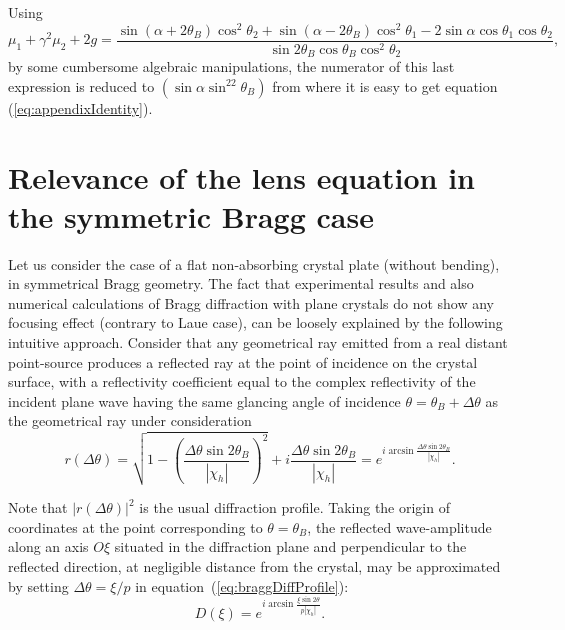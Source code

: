 \documentclass[preprint]{iucr}              %
\newcommand{\inred}[1]{{\color{red}#1}}
\begin{document}
Using
\inred{
\begin{equation}
    \mu_1 + \gamma^2 \mu_2 + 2 g = \frac{
    \sin(\alpha+2 \theta_B)\cos^2\theta_2 + \sin(\alpha-2\theta_B) \cos^2\theta_1 - 2 \sin\alpha \cos\theta_1 \cos\theta_2
    }{
    \sin2\theta_B \cos\theta_B \cos^2\theta_2
    },
\end{equation}
by some cumbersome algebraic manipulations, the numerator of this last expression is reduced to $(\sin\alpha \sin^22\theta_B)$ from where it is easy to get equation (\ref{eq:appendixIdentity}).
}

\section{Relevance of the lens equation in the symmetric Bragg case}
\label{sec:BraggGeometry}

Let us consider the case of a flat non-absorbing crystal plate (without bending), in symmetrical Bragg geometry. The fact that experimental results and also numerical calculations \cite{Honkanen2018} of Bragg diffraction with plane crystals do not show any focusing effect (contrary to Laue case), can be loosely explained by the following intuitive approach. Consider that any geometrical ray emitted from a real distant point-source produces a reflected ray at the point of incidence on the crystal surface, with a reflectivity coefficient equal to the complex reflectivity of the incident plane wave having the same glancing angle of incidence $\theta=\theta_B+\Delta\theta$ as the geometrical ray under consideration
\begin{equation}
\label{eq:braggDiffProfile}
    r(\Delta\theta) = \sqrt{1-\left(\frac{\Delta\theta\sin2\theta_B}{|\chi_h|}\right)^2} + i \frac{\Delta\theta\sin2\theta_B}{|\chi_h|} =
    e^{i \arcsin{\frac{\Delta\theta \sin2\theta_B}{ |\chi_h|}}}.
\end{equation}

Note that $|r(\Delta\theta)|^2$ is the usual diffraction profile. Taking the origin of coordinates at the point corresponding to $\theta=\theta_B$, the reflected wave-amplitude along an axis $O\xi$ situated in the diffraction plane and perpendicular to the reflected direction, at negligible distance from the crystal, may be approximated by setting  $\Delta\theta=\xi/p$ in equation~(\ref{eq:braggDiffProfile}):
\begin{equation}
    D(\xi) = e^{i \arcsin{\frac{\xi \sin2\theta}{p |\chi_h|}}}.
\end{equation}
\end{document}
